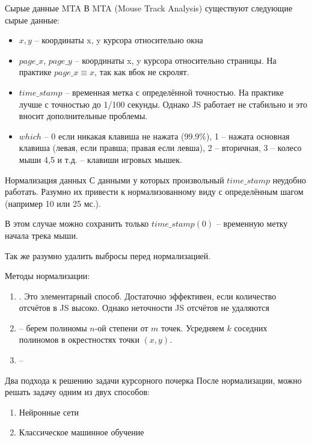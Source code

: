 \begin{frame}{Сырые данные MTA}
	\small
	В MTA (Mouse Track Analysis) существуют следующие сырые данные:
	\begin{itemize}
		\item $x, y$ -- координаты x, y курсора относительно окна
		\item $page\_x$, $page\_y$ -- координаты x, y курсора относительно страницы.
		На практике $page\_x \equiv x$, так как вбок не скролят. 
		\item $time\_stamp$ -- временная метка с определённой точностью.
		На практике лучше с точностью до 1/100 секунды. 
		Однако JS работает не стабильно и это вносит дополнительные проблемы.
		\item $which$ -- 0 если никакая клавиша не нажата (99.9\%),
		1 -- нажата основная клавиша (левая, если правша; правая если левша),
		2 -- вторичная,
		3 -- колесо мыши
		4,5 и т.д. -- клавиши игровых мышек.
	\end{itemize}
\end{frame}

\begin{frame}{Нормализация данных}
	\small
	С данными у которых произвольный $time\_stamp$ неудобно работать. 
	Разумно их привести к нормализованному виду с определённым шагом
	(например 10 или 25 мс.).
	
	В этом случае можно сохранить только $time\_stamp(0)$ -- временную метку начала трека мыши.

	Так же разумно удалить выбросы перед нормализацией.

	Методы нормализации:
	\begin{enumerate}
		\item {}.
		Это элементарный способ. Достаточно эффективен, если количество отсчётов в JS
		высоко. Однако неточности JS отсчётов не удаляются
		\item {} -- берем полиномы $n$-ой степени от $m$ точек. 
		Усредняем $k$ соседних полиномов в окрестностях точки $(x,y)$.
		\item {} -- 
	\end{enumerate}
\end{frame}

\begin{frame}{Два подхода к решению задачи курсорного почерка}
	После нормализации, можно решать задачу одним из двух способов:
	\begin{enumerate}
		\item Нейронные сети
		\item Классическое машинное обучение
	\end{enumerate}
\end{frame}

